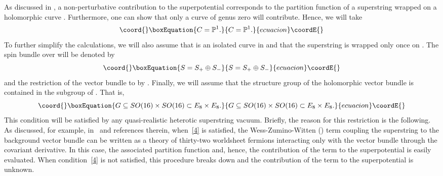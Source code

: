 \documentclass[a4paper,12pt]{article}
\numberwithin{equation}{section}
\theoremstyle{plain}
\begin{document}
As discussed in \cite{BBS}, a non-perturbative contribution to the
superpotential corresponds to the partition function of a superstring
wrapped
on a holomorphic curve \coordHE{}. Furthermore, one can show
\cite{Witten1} that only a curve of genus zero will contribute.
Hence, we will take
%
\begin{equation}\coord{}\boxEquation{
C={\mathbb P}^1.
\label{4.5}
}{
C={\mathbb P}^1.
}{ecuacion}\coordE{}\end{equation}
%
To further simplify the calculations, we will also assume that \coordHE{}
is an isolated curve in \coordHE{} and that the superstring is wrapped only once
on \coordHE{}. The spin bundle over \coordHE{} will be denoted by
%
\begin{equation}\coord{}\boxEquation{
S = S_{+} \oplus S_{-}
\label{5}
}{
S = S_{+} \oplus S_{-}
}{ecuacion}\coordE{}\end{equation}
%
and the restriction of the vector bundle \coordHE{} to \coordHE{} by \coordHE{}.
Finally, we will assume that the structure group of the
holomorphic vector bundle is contained in the
subgroup \coordHE{}
of \coordHE{}. That is,
%
\begin{equation}\coord{}\boxEquation{
G \subseteq SO(16) \times SO(16) \subset E_8 \times E_8.
\label{4}
}{
G \subseteq SO(16) \times SO(16) \subset E_8 \times E_8.
}{ecuacion}\coordE{}\end{equation}
%
This condition will be satisfied by any quasi-realistic heterotic
superstring vacuum. Briefly, the reason for this restriction is the
following. As discussed, for example, in~\cite{Witten1,Lima1} and
references
therein, when~\eqref{4} is
satisfied, the Wess-Zumino-Witten (\coordHE{}) term coupling the superstring to
the
background vector bundle can be written as a theory of thirty-two
worldsheet
fermions interacting only with the vector bundle through the
covariant derivative. In this case, the associated partition function and,
hence, the contribution of the \coordHE{} term to the superpotential is easily
evaluated. When condition~\eqref{4} is not satisfied, this procedure
breaks
down and the contribution of the \coordHE{} term to the superpotential is
unknown.
\end{document}
